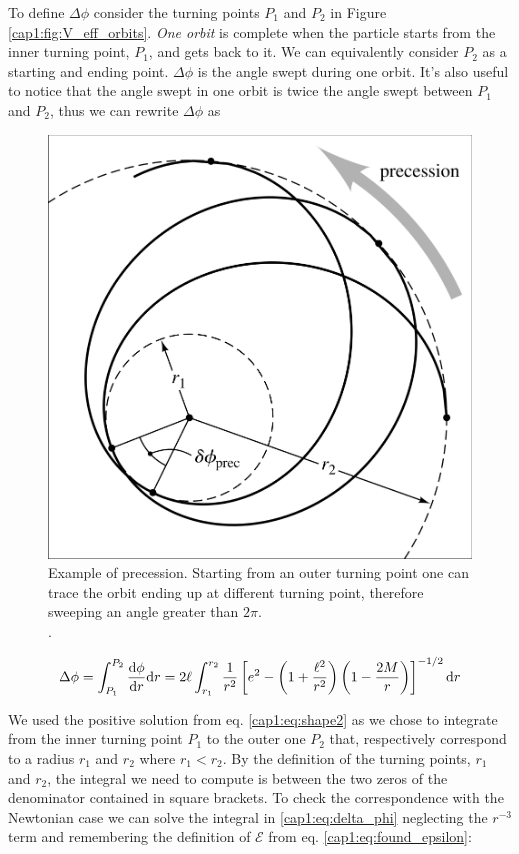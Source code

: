 To define $\Delta \phi$ consider the turning points $P_1$ and $P_2$ in Figure
\ref{cap1:fig:V_eff_orbits}.
\textit{One orbit} is complete when the particle starts from the inner turning
point, $P_1$, and gets back to it.
We can equivalently consider $P_2$ as a starting and ending point.
$\Delta \phi$ is the angle swept during one orbit.
It's also useful to notice that the angle swept in one orbit is twice the angle
swept between $P_1$ and $P_2$, thus we can rewrite $\Delta \phi$ as

\begin{figure}[h]
    \centering
    \includegraphics[width = 0.5 \textwidth]{Figures/chapter1/precession_bozza.png}
    \caption{Example of precession.
    Starting from an outer turning point one can trace the orbit ending up at
    different turning point, therefore sweeping an angle greater than $2 \pi$.
    \\ .}
    \label{cap1:fig:precession}
\end{figure}

\begin{equation}
    \Delta \phi = \int_{P_1}^{P_2} \dv{\phi}{r} \mathrm{d}r
    = 2 \ell \int_{r_1}^{r_2} \frac{1}{r^2}
    \left[e^2 - \left(1 + \frac{\ell^2}{r^2}\right)
    \left(1 - \frac{2M}{r}\right)\right]^{-1/2} \mathrm{d}r
    \label{cap1:eq:delta_phi}
\end{equation}

We used the positive solution from eq. \ref{cap1:eq:shape2} as we chose to
integrate from the inner turning point $P_1$ to the outer one $P_2$ that,
respectively correspond to a radius $r_1$ and $r_2$ where $r_1 < r_2$.
By the definition of the turning points, $r_1$ and $r_2$, the integral we need
to compute is between the two zeros of the denominator contained in square
brackets.
To check the correspondence with the Newtonian case we can solve the integral
in \ref{cap1:eq:delta_phi} neglecting the $r^{-3}$ term and remembering the
definition of $\mathcal E$ from eq. \ref{cap1:eq:found_epsilon}:


